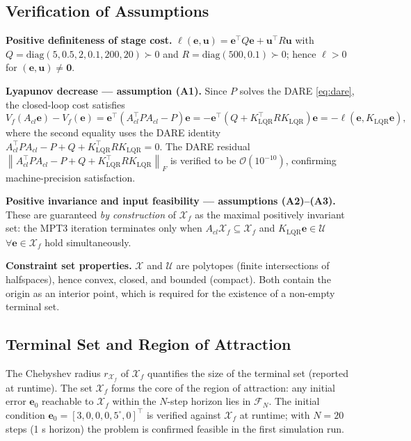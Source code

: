 \documentclass[11pt,a4paper]{article}
\newcommand{\vect}[1]{\bm{#1}}
\newcommand{\eset}{\mathcal{X}}
\newcommand{\uset}{\mathcal{U}}
\newcommand{\xf}{\mathcal{X}_f}
\newcommand{\norm}[1]{\left\lVert #1 \right\rVert}
\begin{document}
\subsection{Verification of Assumptions}

\textbf{Positive definiteness of stage cost.}
$\ell(\vect{e},\vect{u}) = \vect{e}^\top Q\vect{e} + \vect{u}^\top R\vect{u}$
with $Q = \mathrm{diag}(5,0.5,2,0.1,200,20) \succ 0$ and
$R = \mathrm{diag}(500,0.1) \succ 0$; hence $\ell > 0$ for $(\vect{e},\vect{u}) \neq \vect{0}$.

\textbf{Lyapunov decrease — assumption (A1).}
Since $P$ solves the DARE \eqref{eq:dare}, the closed-loop cost satisfies
\begin{equation}
  V_f(A_{cl}\vect{e}) - V_f(\vect{e})
  = \vect{e}^\top(A_{cl}^\top P A_{cl} - P)\vect{e}
  = -\vect{e}^\top(Q + K_{\mathrm{LQR}}^\top R K_{\mathrm{LQR}})\vect{e}
  = -\ell(\vect{e}, K_{\mathrm{LQR}}\vect{e}),
  \label{eq:lyap_decrease}
\end{equation}
where the second equality uses the DARE identity
$A_{cl}^\top P A_{cl} - P + Q + K_{\mathrm{LQR}}^\top R K_{\mathrm{LQR}} = 0$.
The DARE residual $\norm{A_{cl}^\top P A_{cl} - P + Q + K_{\mathrm{LQR}}^\top
R K_{\mathrm{LQR}}}_F$ is verified to be $\mathcal{O}(10^{-10})$, confirming
machine-precision satisfaction.

\textbf{Positive invariance and input feasibility — assumptions (A2)--(A3).}
These are guaranteed \emph{by construction} of $\xf$ as the maximal positively
invariant set: the MPT3 iteration terminates only when
$A_{cl}\xf \subseteq \xf$ and $K_{\mathrm{LQR}}\vect{e} \in \uset$
$\forall \vect{e} \in \xf$ hold simultaneously.

\textbf{Constraint set properties.}
$\eset$ and $\uset$ are polytopes (finite intersections of halfspaces), hence
convex, closed, and bounded (compact).  Both contain the origin as an interior
point, which is required for the existence of a non-empty terminal set.

\subsection{Terminal Set and Region of Attraction}

The Chebyshev radius $r_{\xf}$ of $\xf$ quantifies the size of the terminal set
(reported at runtime).  The set $\xf$ forms the core of the region of attraction:
any initial error $\vect{e}_0$ reachable to $\xf$ within the $N$-step horizon lies
in $\mathcal{F}_N$.  The initial condition $\vect{e}_0 = [3, 0, 0, 0, 5^{\circ}, 0]^\top$
is verified against $\xf$ at runtime; with $N = 20$ steps (1 s horizon) the
problem is confirmed feasible in the first simulation run.
\end{document}
